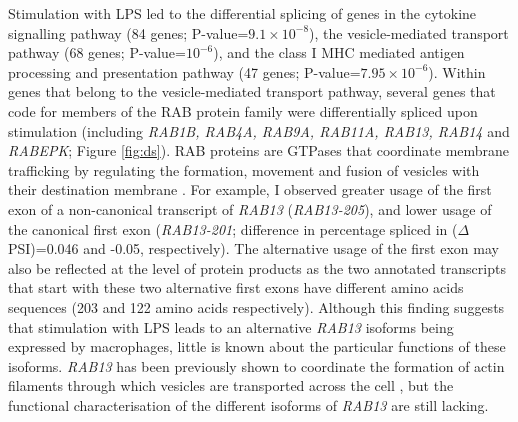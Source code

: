 Stimulation with LPS led to the differential splicing of genes in the cytokine signalling pathway (84 genes; P-value=$9.1\times10^{-8}$), the vesicle-mediated transport pathway (68 genes; P-value=$10^{-6}$), and the class I MHC mediated antigen processing and presentation pathway (47 genes; P-value=$7.95\times10^{-6}$). Within genes that belong to the vesicle-mediated transport pathway, several genes that code for members of the RAB protein family were differentially spliced upon stimulation (including \textit{RAB1B, RAB4A, RAB9A, RAB11A, RAB13, RAB14} and \textit{RABEPK}; Figure \ref{fig:ds}). RAB proteins are GTPases that coordinate membrane trafficking by regulating the formation, movement and fusion of vesicles with their destination membrane \cite{Stenmark2009-ju}. For example, I observed greater usage of the first exon of a non-canonical transcript of \textit{RAB13} (\textit{RAB13-205}), and lower usage of the canonical first exon (\textit{RAB13-201}; difference in percentage spliced in ($\Delta$PSI)=0.046 and -0.05, respectively). The alternative usage of the first exon may also be reflected at the level of protein products as the two annotated transcripts that start with these two alternative first exons have different amino acids sequences (203 and 122 amino acids respectively). Although this finding suggests that stimulation with LPS leads to an alternative \textit{RAB13} isoforms being expressed by macrophages, little is known about the particular functions of these isoforms. \textit{RAB13} has been previously shown to coordinate the formation of actin filaments through which vesicles are transported across the cell \cite{Sakane2012-km}, but the functional characterisation of the different isoforms of \textit{RAB13} are still lacking.\\

